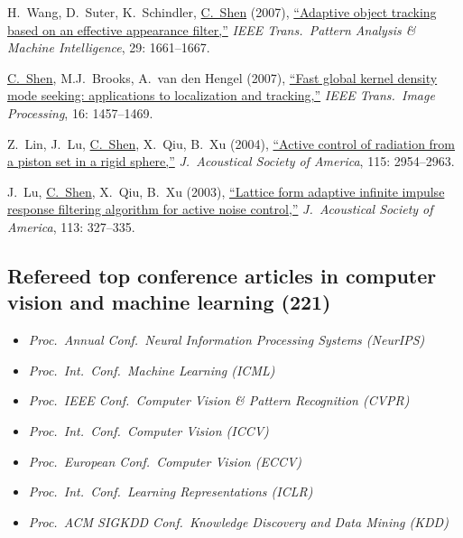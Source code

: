 \documentclass[9pt, a4paper]{article}
\newcommand{\years}[1]{\marginnote{\scriptsize #1}}
\def\highlight{\uline}
\begin{document}
\medskip

\years{2007} H.~Wang, D.~Suter, K.~Schindler, \highlight{C.~Shen} (2007),
\href{http://www.google.com/search?lr=&ie=UTF-8&oe=UTF-8&q=Adaptive+object+tracking+based+on+an+effective+appearance+filter+Hanzi+Wang%2C+David+Suter%2C+Konrad+Schindler%2C+Chunhua+Shen}{``Adaptive object tracking based on an effective appearance filter,{}''}
\emph{IEEE Trans.\  Pattern Analysis \& Machine Intelligence}, 29: 1661--1667.

\medskip

\years{2007} \highlight{C.~Shen}, M.J.~Brooks, A.~van den Hengel (2007),
\href{http://www.google.com/search?lr=&ie=UTF-8&oe=UTF-8&q=Fast+global+kernel+density+mode+seeking%3A+applications+to+localization+and+tracking+Chunhua+Shen%2C+Michael+J.+Brooks%2C+Anton+van+den+Hengel}{``Fast global kernel density mode seeking: applications to localization and tracking,{}''}
\emph{IEEE Trans.\  Image Processing}, 16: 1457--1469.

\medskip

\years{2004} Z.~Lin, J.~Lu, \highlight{C.~Shen}, X.~Qiu, B.~Xu (2004),
\href{http://www.google.com/search?lr=&ie=UTF-8&oe=UTF-8&q=Active+control+of+radiation+from+a+piston+set+in+a+rigid+sphere+Zhibin+Lin%2C+Jing+Lu%2C+Chunhua+Shen%2C+Xiaojun+Qiu%2C+Boling+Xu}{``Active control of radiation from a piston set in a rigid sphere,{}''}
\emph{J.\  Acoustical Society of America}, 115: 2954--2963.

\medskip

\years{2003} J.~Lu, \highlight{C.~Shen}, X.~Qiu, B.~Xu (2003),
\href{http://www.google.com/search?lr=&ie=UTF-8&oe=UTF-8&q=Lattice+form+adaptive+infinite+impulse+response+filtering+algorithm+for+active+noise+control+Jing+Lu%2C+Chunhua+Shen%2C+Xiaojun+Qiu%2C+Boling+Xu}{``Lattice form adaptive infinite impulse response filtering algorithm for active noise control,{}''}
\emph{J.\  Acoustical Society of America}, 113: 327--335.

\medskip

\vspace{-0.15cm}
\subsection*{Refereed top conference articles in computer vision and machine learning (221)}

{
\begin{itemize}
  \itemsep -.12cm
\footnotesize
\item \emph{Proc.\ Annual Conf.\ Neural Information Processing Systems (NeurIPS)}
\item \emph{Proc.\ Int.\ Conf.\ Machine Learning (ICML)}
\item \emph{Proc.\ IEEE Conf.\ Computer Vision \& Pattern Recognition (CVPR)}
\item \emph{Proc.\ Int.\ Conf.\ Computer Vision (ICCV)}
\item \emph{Proc.\ European Conf.\ Computer Vision (ECCV)}
\item \emph{Proc.\ Int.\ Conf.\ Learning Representations (ICLR)}
\item \emph{Proc.\ ACM SIGKDD Conf.\ Knowledge Discovery and Data Mining (KDD)}
\end{itemize}
}
\end{document}
